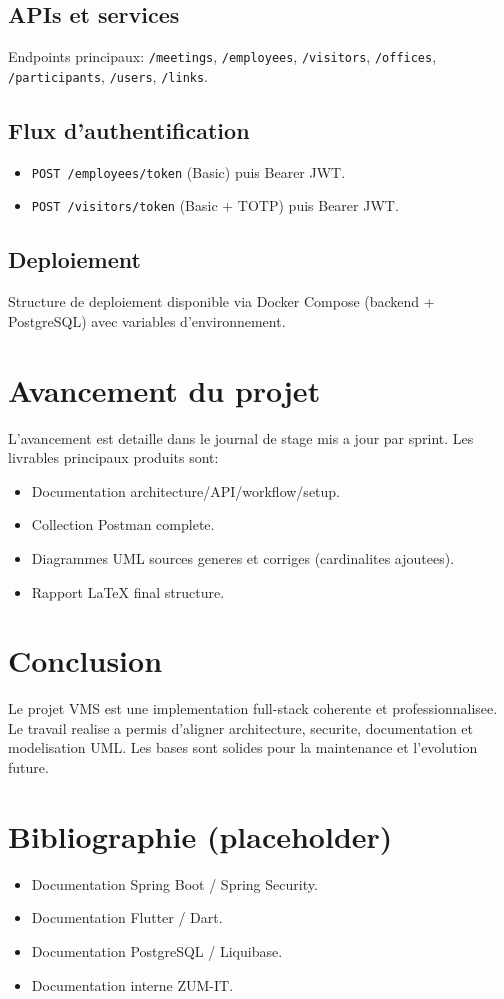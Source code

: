 \documentclass[12pt,a4paper]{article}
\begin{document}
\subsection{APIs et services}
Endpoints principaux: \texttt{/meetings}, \texttt{/employees}, \texttt{/visitors}, \texttt{/offices}, \texttt{/participants}, \texttt{/users}, \texttt{/links}.
\subsection{Flux d'authentification}
\begin{itemize}
  \item \texttt{POST /employees/token} (Basic) puis Bearer JWT.
  \item \texttt{POST /visitors/token} (Basic + TOTP) puis Bearer JWT.
\end{itemize}
\subsection{Deploiement}
Structure de deploiement disponible via Docker Compose (backend + PostgreSQL) avec variables d'environnement.

\section{Avancement du projet}
L'avancement est detaille dans le journal de stage mis a jour par sprint. Les livrables principaux produits sont:
\begin{itemize}
  \item Documentation architecture/API/workflow/setup.
  \item Collection Postman complete.
  \item Diagrammes UML sources generes et corriges (cardinalites ajoutees).
  \item Rapport LaTeX final structure.
\end{itemize}

\section{Conclusion}
Le projet VMS est une implementation full-stack coherente et professionnalisee. Le travail realise a permis d'aligner architecture, securite, documentation et modelisation UML. Les bases sont solides pour la maintenance et l'evolution future.

\section*{Bibliographie (placeholder)}
\begin{itemize}
  \item Documentation Spring Boot / Spring Security.
  \item Documentation Flutter / Dart.
  \item Documentation PostgreSQL / Liquibase.
  \item Documentation interne ZUM-IT.
\end{itemize}
\end{document}
